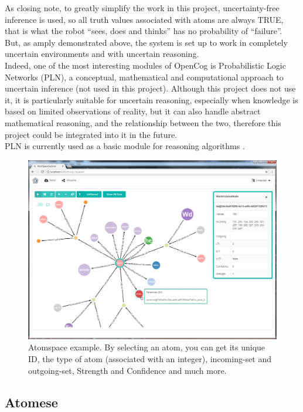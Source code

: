 As closing note, to greatly simplify the work in this project, uncertainty-free inference is used, so all truth values associated with atoms are always TRUE, that is what the robot \enquote{sees, does and thinks} has no probability of \enquote{failure}. But, as amply demonstrated above, the system is set up to work in completely uncertain environments and with uncertain reasoning. \\
Indeed, one of the most interesting modules of OpenCog is Probabilistic Logic Networks (PLN), a conceptual, mathematical and computational approach to uncertain inference (not used in this project). Although this project does not use it, it is particularly suitable for uncertain reasoning, especially when knowledge is based on limited observations of reality, but it can also handle abstract mathematical reasoning, and the relationship between the two, therefore this project could be integrated into it in the future. \\
PLN is currently used as a basic module for reasoning algorithms \cite{goertzel2008probabilistic, Goertzel2011RealWorldRT}. 

\begin{figure}[h]
\centering
\includegraphics[width=1.0
\textwidth]{figures/Magistrale/atomspace_explorer}
\caption[AtomSpace Explorer ]{Atomspace example. By selecting an atom, you can get its unique ID, the type of atom (associated with an integer), incoming-set and outgoing-set, Strength and Confidence and much more.
\label{fig:atomspace_explorer}}
\end{figure}


\subsection{Atomese}\label{sec:atomese}

